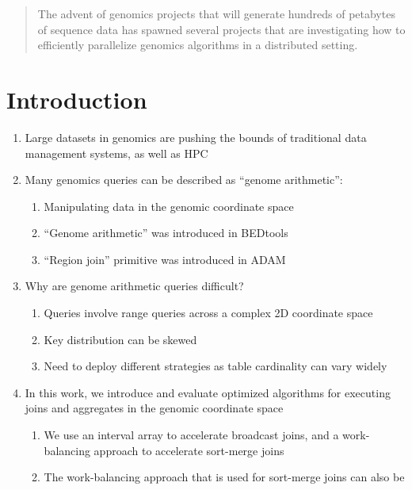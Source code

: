 \documentclass{vldb}
\begin{document}
\maketitle

\begin{abstract}
The advent of genomics projects that will generate hundreds of petabytes of
sequence data has spawned several projects that are investigating how to
efficiently parallelize genomics algorithms in a distributed setting.
\end{abstract}

\section{Introduction}
\label{sec:introduction}

\begin{enumerate}
\item Large datasets in genomics are pushing the bounds of traditional
data management systems, as well as HPC
\item Many genomics queries can be described as ``genome arithmetic'':
\begin{enumerate}
\item Manipulating data in the genomic coordinate space
\item ``Genome arithmetic'' was introduced in BEDtools~\cite{quinlan10}
\item ``Region join'' primitive was introduced in ADAM~\cite{nothaft15}
\end{enumerate}
\item Why are genome arithmetic queries difficult?
\begin{enumerate}
\item Queries involve range queries across a complex 2D coordinate space
\item Key distribution can be skewed
\item Need to deploy different strategies as table cardinality can vary
widely~\cite{kozanitis16}
\end{enumerate}
\item In this work, we introduce and evaluate optimized algorithms for executing
joins and aggregates in the genomic coordinate space
\begin{enumerate}
\item We use an interval array to accelerate broadcast joins, and a work-balancing
approach to accelerate sort-merge joins
\item The work-balancing approach that is used for sort-merge joins can also be

\end{enumerate}
\end{enumerate}
\end{document}
